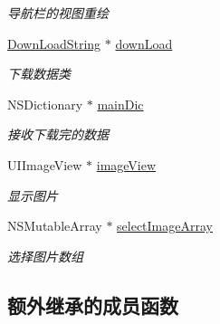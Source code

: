 \begin{DoxyCompactItemize}
\begin{DoxyCompactList}\small\item\em 导航栏的视图重绘 \end{DoxyCompactList}\item 
\hypertarget{interface_main_view_controller_a91dc5cbbb04b3e8c925f747f8fed3a6e}{\hyperlink{interface_down_load_string}{Down\-Load\-String} $\ast$ \hyperlink{interface_main_view_controller_a91dc5cbbb04b3e8c925f747f8fed3a6e}{down\-Load}}\label{interface_main_view_controller_a91dc5cbbb04b3e8c925f747f8fed3a6e}

\begin{DoxyCompactList}\small\item\em 下载数据类 \end{DoxyCompactList}\item 
\hypertarget{interface_main_view_controller_a39e05eee835ebf23c2375ff7565a2357}{N\-S\-Dictionary $\ast$ \hyperlink{interface_main_view_controller_a39e05eee835ebf23c2375ff7565a2357}{main\-Dic}}\label{interface_main_view_controller_a39e05eee835ebf23c2375ff7565a2357}

\begin{DoxyCompactList}\small\item\em 接收下载完的数据 \end{DoxyCompactList}\item 
\hypertarget{interface_main_view_controller_a4cc0ee50feca3b06b12297847035a1a1}{U\-I\-Image\-View $\ast$ \hyperlink{interface_main_view_controller_a4cc0ee50feca3b06b12297847035a1a1}{image\-View}}\label{interface_main_view_controller_a4cc0ee50feca3b06b12297847035a1a1}

\begin{DoxyCompactList}\small\item\em 显示图片 \end{DoxyCompactList}\item 
\hypertarget{interface_main_view_controller_aa257e69a571d17651210b424e312550c}{N\-S\-Mutable\-Array $\ast$ \hyperlink{interface_main_view_controller_aa257e69a571d17651210b424e312550c}{select\-Image\-Array}}\label{interface_main_view_controller_aa257e69a571d17651210b424e312550c}

\begin{DoxyCompactList}\small\item\em 选择图片数组 \end{DoxyCompactList}\end{DoxyCompactItemize}
\subsection*{额外继承的成员函数}

